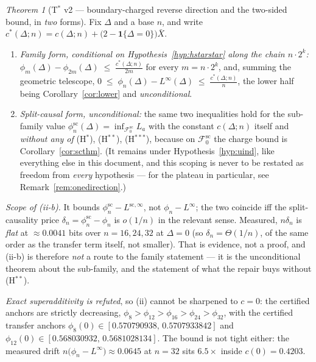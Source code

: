 \documentclass[11pt]{article}
\theoremstyle{definition}
\theoremstyle{remark}
\newtheorem{namedthm}{Theorem}
\begin{document}
\begin{namedthm}[T$^\ast$ v2 --- boundary-charged reverse direction and
the two-sided bound, in \emph{two} forms]
\label{thm:transfer2}
Fix $\Delta$ and a base $n$, and write
$c^\ast(\Delta;n)=c(\Delta;n)+\bigl(2-\mathbf 1\{\Delta=0\}\bigr)
\bar X$.
\begin{enumerate}
\item[(ii-a)] \emph{Family form, conditional on
Hypothesis~\ref{hyp:hstarstar} along the chain $n\cdot2^k$:}
$\displaystyle
\phi_m(\Delta)-\phi_{2m}(\Delta)\;\le\;\frac{c^\ast(\Delta;n)}{2m}$
for every $m=n\cdot2^k$, and, summing the geometric telescope,
$\displaystyle 0\;\le\;\phi_n(\Delta)-L^\infty(\Delta)\;\le\;
\frac{c^\ast(\Delta;n)}{n}$, the lower half being
Corollary~\ref{cor:lower} and \emph{unconditional}.
\item[(ii-b)] \emph{Split-causal form, \emph{unconditional}:} the same
two inequalities hold for the sub-family value
$\phi^{\mathrm{sc}}_n(\Delta)=\inf_{\mathcal F_0^{\mathrm{sc}}}L_a$
with the constant $c(\Delta;n)$ itself and \emph{without any of}
(H$^\ast$), (H$^{\ast\ast}$), (H$^{\ast\ast\ast}$), because on
$\mathcal F_0^{\mathrm{sc}}$ the charge bound is
Corollary~\ref{cor:scthm}. (It remains under
Hypothesis~\ref{hyp:uind}, like everything else in this document, and
this scoping is never to be restated as freedom from \emph{every}
hypothesis --- for the plateau in particular, see
Remark~\ref{rem:onedirection}.)
\end{enumerate}
\emph{Scope of (ii-b).} It bounds
$\phi^{\mathrm{sc}}_n-L^{\mathrm{sc},\infty}$, not
$\phi_n-L^\infty$; the two coincide iff the split-causality price
$\delta_n=\phi^{\mathrm{sc}}_n-\phi_n$ is $o(1/n)$ in the relevant
sense. Measured, $n\delta_n$ is \emph{flat} at $\approx0.0041$ bits
over $n=16,24,32$ at $\Delta=0$ (so $\delta_n=\Theta(1/n)$, of the same
order as the transfer term itself, not smaller). That is evidence, not
a proof, and (ii-b) is therefore \emph{not} a route to the family
statement --- it is the unconditional theorem about the sub-family, and
the statement of what the repair buys without (H$^{\ast\ast}$).

\emph{Exact superadditivity is refuted}, so (ii) cannot be sharpened to
$c=0$: the certified anchors are strictly decreasing,
$\phi_8>\phi_{12}>\phi_{16}>\phi_{24}>\phi_{32}$, with the
certified transfer anchors
$\phi_8(0)\in[0.570790938,\,0.5707933842]$ and
$\phi_{12}(0)\in[0.568030932,\,0.5681028134]$. The bound is not tight
either: the measured drift $n\bigl(\phi_n-L^\infty\bigr)\approx0.0645$
at $n=32$ sits $6.5\times$ inside $c(0)=0.4203$.
\end{namedthm}
\end{document}
